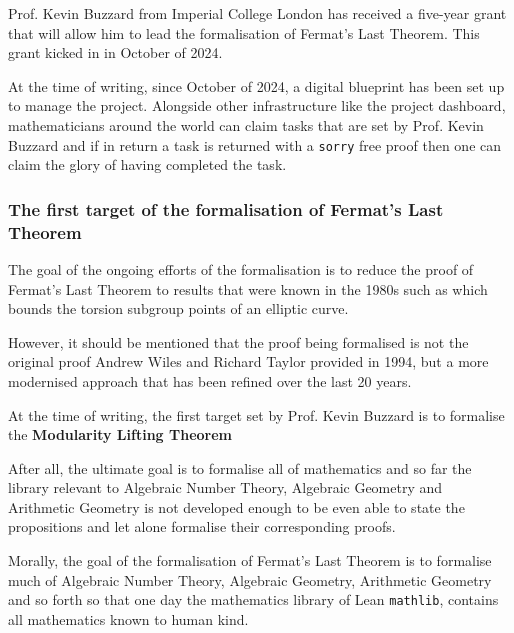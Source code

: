 Prof. Kevin Buzzard from Imperial College London has received a five-year grant that will allow him to lead the formalisation of Fermat's Last Theorem. This grant kicked in in October of 2024. 

At the time of writing, since October of 2024, a digital blueprint has been set up to manage the project. Alongside other infrastructure like the project dashboard, mathematicians around the world can 
claim tasks that are set by Prof. Kevin Buzzard and if in return a task is returned with a \texttt{sorry} free proof then one can claim the glory of having completed the task.

\subsubsection{The first target of the formalisation of Fermat's Last Theorem}

The goal of the ongoing efforts of the formalisation is to reduce the proof of Fermat's Last Theorem to results that were known in the 1980s such as  
which bounds the torsion subgroup points of an elliptic curve.

However, it should be mentioned that the proof being formalised is not the original proof Andrew Wiles and Richard Taylor provided in 1994, 
but a more modernised approach that has been refined over the last 20 years.

At the time of writing, the first target set by Prof. Kevin Buzzard is to formalise the \textbf{Modularity Lifting Theorem}



After all, the ultimate goal is to formalise all of mathematics and so far the library relevant to Algebraic Number Theory, Algebraic Geometry and Arithmetic Geometry is not developed enough
to be even able to state the propositions and let alone formalise their corresponding proofs.

Morally, the goal of the formalisation of Fermat's Last Theorem is to formalise much of Algebraic Number Theory, Algebraic Geometry, Arithmetic Geometry and so forth so that one day
the mathematics library of Lean \texttt{mathlib}, contains all mathematics known to human kind.



